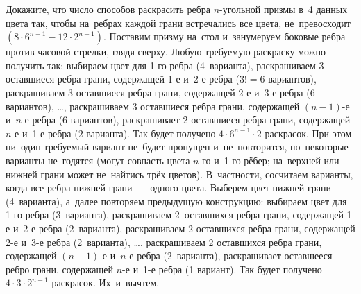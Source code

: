 \problem
Докажите, что число способов раскрасить ребра $n$-угольной призмы в~4 данных
цвета так, чтобы на~ребрах каждой грани встречались все цвета, не~превосходит
$(8 \cdot 6^{n-1} - 12 \cdot 2^{n-1})$.
\solution
Поставим призму на~стол и~занумеруем боковые ребра против часовой стрелки,
глядя сверху.
Любую требуемую раскраску можно получить так:
выбираем цвет для 1-го ребра (4~варианта),
раскрашиваем 3 оставшиеся ребра грани, содержащей 1-е и~2-е ребра
($3! = 6$ вариантов),
раскрашиваем 3 оставшиеся ребра грани, содержащей 2-е и~3-е ребра
(6 вариантов),
\ldots,
раскрашиваем 3 оставшиеся ребра грани, содержащей $(n-1)$-е и~$n$-е ребра
(6 вариантов),
раскрашивает 2 оставшиеся ребра грани, содержащей $n$-е и~1-е ребра
(2 варианта).
Так будет получено $4 \cdot 6^{n-1} \cdot 2$ раскрасок.
При этом ни~один требуемый вариант не~будет пропущен и~не~повторится,
но~некоторые варианты не~годятся 
(могут совпасть цвета $n$-го и~1-го рёбер; на~верхней или нижней грани может
не~найтись трёх цветов).
В~частности, сосчитаем варианты, когда все ребра нижней грани~--- одного цвета.
Выберем цвет нижней грани (4~варианта), а~далее повторяем предыдущую
конструкцию: выбираем цвет для 1-го ребра (3~варианта),
раскрашиваем 2~оставшихся ребра грани, содержащей 1-е и~2-е ребра (2~варианта),
раскрашиваем 2 оставшихся ребра грани, содержащей 2-е и~3-е ребра (2~варианта),
\ldots,
раскрашиваем 2 оставшихся ребра грани, содержащей $(n-1)$-е и~$n$-е ребра
(2~варианта),
раскрашивает оставшееся ребро грани, содержащей $n$-е и~1-е ребра
(1 вариант).
Так будет получено $4 \cdot 3 \cdot 2^{n-1}$ раскрасок.
Их~и~вычтем.
\endproblem
